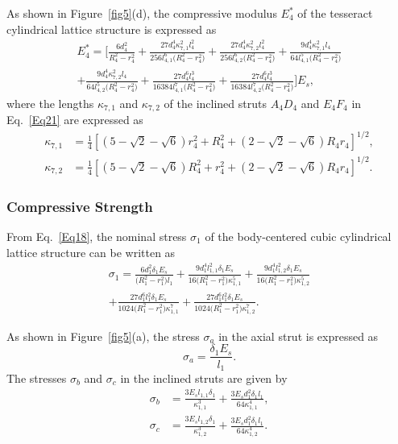 \documentclass[12pt,a4paper]{article}
\begin{document}
	As shown in Figure~\ref{fig5}(d), the compressive modulus $E_4^*$ of the tesseract cylindrical lattice structure is expressed as
	\begin{multline}
		E_4^*
		= \Bigg[
		\frac{6d_4^2}{R_4^2-r_4^2}
		+\frac{27d_4^4\kappa_{7,1}^2l_4^2}
		{256l_{4,1}^6\bigl(R_4^2-r_4^2\bigr)}
		+\frac{27d_4^4\kappa_{7,2}^2l_4^2}
		{256l_{4,2}^6\bigl(R_4^2-r_4^2\bigr)}
		+\frac{9d_4^4\kappa_{7,1}^2l_4}
		{64l_{4,1}^5\bigl(R_4^2-r_4^2\bigr)}
		\\
		+\frac{9d_4^4\kappa_{7,2}^2l_4}
		{64l_{4,2}^5\bigl(R_4^2-r_4^2\bigr)}
		+\frac{27d_4^6l_4^3}
		{16384l_{4,1}^7\bigl(R_4^2-r_4^2\bigr)}
		+\frac{27d_4^6l_4^3}
		{16384l_{4,2}^7\bigl(R_4^2-r_4^2\bigr)}
		\Bigg]E_s ,
		\label{Eq21}
	\end{multline}
	where the lengths $\kappa_{7,1}$ and $\kappa_{7,2}$ of the inclined struts $A_4D_4$ and $E_4F_4$ in Eq.~\eqref{Eq21} are expressed as
	\[
	\begin{aligned}
		\kappa_{7,1}
		&=
		\frac{1}{4}
		\left[
		\left(5-\sqrt{2}-\sqrt{6}\right)r_4^2
		+R_4^2
		+\left(2-\sqrt{2}-\sqrt{6}\right)R_4r_4
		\right]^{1/2}, \\
		\kappa_{7,2}
		&=
		\frac{1}{4}
		\left[
		\left(5-\sqrt{2}-\sqrt{6}\right)R_4^2
		+r_4^2
		+\left(2-\sqrt{2}-\sqrt{6}\right)R_4r_4
		\right]^{1/2}.
	\end{aligned}
	\]
	

	\subsubsection{Compressive Strength}
	
	From Eq.~\eqref{Eq18}, the nominal stress $\sigma_1$ of the body-centered cubic cylindrical lattice structure can be written as
	\begin{multline}
		\sigma_1
		=
		\frac{6d_1^2\delta_1E_s}
		{\bigl(R_1^2-r_1^2\bigr)l_1}
		+\frac{9d_1^4l_{1,1}^2\delta_1E_s}
		{16\bigl(R_1^2-r_1^2\bigr)\kappa_{1,1}^5}
		+\frac{9d_1^4l_{1,2}^2\delta_1E_s}
		{16\bigl(R_1^2-r_1^2\bigr)\kappa_{1,2}^5} \\
		+\frac{27d_1^6l_1^2\delta_1E_s}
		{1024\bigl(R_1^2-r_1^2\bigr)\kappa_{1,1}^7}
		+\frac{27d_1^6l_1^2\delta_1E_s}
		{1024\bigl(R_1^2-r_1^2\bigr)\kappa_{1,2}^7}.
		\label{Eq22}
	\end{multline}
	
	As shown in Figure~\ref{fig5}(a), the stress $\sigma_a$ in the axial strut is expressed as
	\begin{equation}
		\sigma_a = \frac{\delta_1E_s}{l_1}.
		\label{Eq23}
	\end{equation}
	The stresses $\sigma_b$ and $\sigma_c$ in the inclined struts are given by
	\begin{equation}
		\begin{aligned}
			\sigma_b
			&=
			\frac{3E_sl_{1,1}\delta_1}{\kappa_{1,1}^3}
			+
			\frac{3E_sd_1^2\delta_1l_1}{64\kappa_{1,1}^4}, \\
			\sigma_c
			&=
			\frac{3E_sl_{1,2}\delta_1}{\kappa_{1,2}^3}
			+
			\frac{3E_sd_1^2\delta_1l_1}{64\kappa_{1,2}^4}.
		\end{aligned}
		\label{Eq24}
	\end{equation}
	
\end{document}

